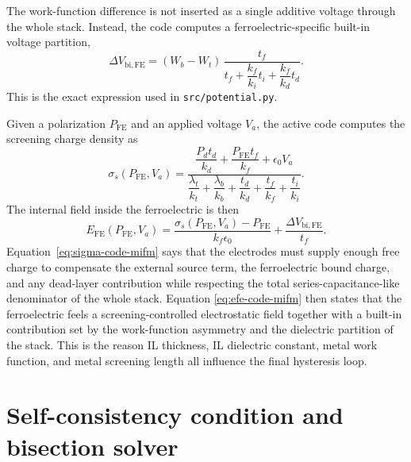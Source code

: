 \documentclass[11pt]{article}
\begin{document}
The work-function difference is not inserted as a single additive voltage
through the whole stack. Instead, the code computes a ferroelectric-specific
built-in voltage partition,
\begin{equation}
\Delta V_{\mathrm{bi,FE}} =
(W_b - W_t)\,
\frac{t_f}{
t_f + \dfrac{k_f}{k_i} t_i + \dfrac{k_f}{k_d} t_d }.
\label{eq:dv-bi-fe-mifm}
\end{equation}
This is the exact expression used in \texttt{src/potential.py}.

Given a polarization $P_{\mathrm{FE}}$ and an applied voltage $V_a$, the active
code computes the screening charge density as
\begin{equation}
\sigma_s(P_{\mathrm{FE}},V_a) =
\frac{
\dfrac{P_d t_d}{k_d}
+
\dfrac{P_{\mathrm{FE}} t_f}{k_f}
+
\epsilon_0 V_a
}{
\dfrac{\lambda_t}{k_t}
+
\dfrac{\lambda_b}{k_b}
+
\dfrac{t_d}{k_d}
+
\dfrac{t_f}{k_f}
+
\dfrac{t_i}{k_i}
}.
\label{eq:sigma-code-mifm}
\end{equation}
The internal field inside the ferroelectric is then
\begin{equation}
E_{\mathrm{FE}}(P_{\mathrm{FE}},V_a) =
\frac{\sigma_s(P_{\mathrm{FE}},V_a)-P_{\mathrm{FE}}}{k_f \epsilon_0}
+
\frac{\Delta V_{\mathrm{bi,FE}}}{t_f}.
\label{eq:efe-code-mifm}
\end{equation}
Equation~\eqref{eq:sigma-code-mifm} says that the electrodes must supply enough
free charge to compensate the external source term, the ferroelectric bound
charge, and any dead-layer contribution while respecting the total
series-capacitance-like denominator of the whole stack. Equation
\eqref{eq:efe-code-mifm} then states that the ferroelectric feels a
screening-controlled electrostatic field together with a built-in contribution
set by the work-function asymmetry and the dielectric partition of the stack.
This is the reason IL thickness, IL dielectric constant, metal work function,
and metal screening length all influence the final hysteresis loop.

\section{Self-consistency condition and bisection solver}
\end{document}
